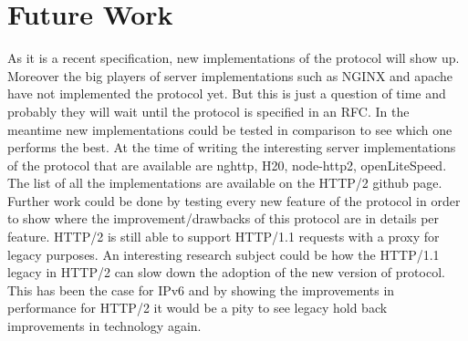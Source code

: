 \section{Future Work}
\label{furtherwork}

As it is a recent specification, new implementations of the protocol will show up. Moreover the big players of server implementations such as NGINX\cite{nginx} and apache \cite{apache2} have not implemented the protocol yet. But this is just a question of time and probably they will wait until the protocol is specified in an RFC. In the meantime new implementations could be tested in comparison to see which one performs the best. At the time of writing the interesting server implementations of the protocol that are available are nghttp, H20, node-http2, openLiteSpeed. The list of all the implementations are available on the HTTP/2 github page.\cite{http2-imp}
Further work could be done by testing every new feature of the protocol in order to show where the improvement/drawbacks of this protocol are in details per feature. 
HTTP/2 is still able to support HTTP/1.1 requests with a proxy for legacy purposes. An interesting research subject could be how the  HTTP/1.1 legacy in HTTP/2 can slow down the adoption of the new version of protocol. This has been the case for IPv6 and by showing the improvements in performance for HTTP/2 it would be a pity to see legacy hold back improvements in technology again.